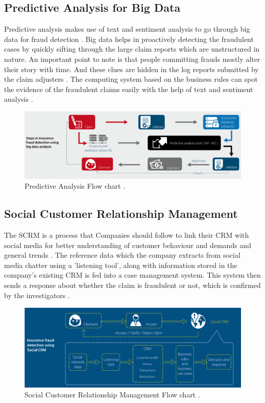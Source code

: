 \documentclass[sigconf]{acmart}
\begin{document}
\subsection{Predictive Analysis for Big Data}
Predictive analysis makes use of text and sentiment analysis to go through big data for fraud detection \cite{link9}. Big data helps in proactively detecting the fraudulent cases by quickly sifting through the large claim reports which are unstructured in nature. An important point to note is that people committing frauds mostly alter their story with time. And these clues are hidden in the log reports submitted by the claim adjusters \cite{link7}. The computing system based on the business rules can spot the evidence of the fraudulent claims easily with the help of text and sentiment analysis \cite{link9}.
\begin{figure}
  \includegraphics[width=\linewidth]{images/predictive_image1.png}
  \caption{Predictive Analysis Flow chart \cite{link7}.}
  \label{Figure 2: Predictive Analysis flowchart}
\end{figure}
\subsection{Social Customer Relationship Management}
The SCRM is a process that Companies should follow to link their CRM with social media for better understanding of customer behaviour and demands and general trends \cite{link9}. The reference data which the company extracts from social media chatter using a 'listening tool', along with information stored in the company's existing CRM is fed into a case management system. This system then sends a response about whether the claim is fraudulent or not, which is confirmed by the investigators \cite{link7}.

\begin{figure}
  \includegraphics[width=\linewidth]{images/SCRM_image1.png}
  \caption{Social Customer Relationship Management Flow chart \cite{link7}.}
  \label{Figure 3:Social Customer Relationship Management Flow chart}
\end{figure}
\end{document}
